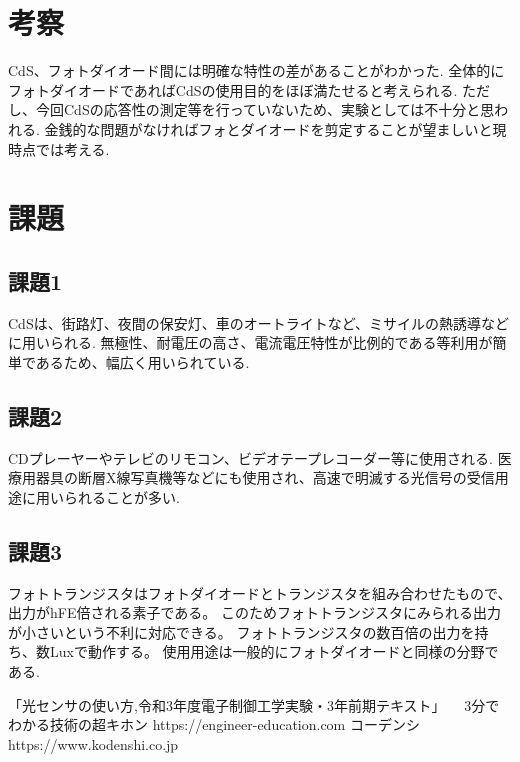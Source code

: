 \documentclass[titlepage]{jarticle}
\begin{document}
\section{考察}
CdS、フォトダイオード間には明確な特性の差があることがわかった.
全体的にフォトダイオードであればCdSの使用目的をほぼ満たせると考えられる.
ただし、今回CdSの応答性の測定等を行っていないため、実験としては不十分と思われる.
金銭的な問題がなければフォとダイオードを剪定することが望ましいと現時点では考える.

\section{課題}
\subsection{課題1}
CdSは、街路灯、夜間の保安灯、車のオートライトなど、ミサイルの熱誘導などに用いられる.
無極性、耐電圧の高さ、電流電圧特性が比例的である等利用が簡単であるため、幅広く用いられている.
\subsection{課題2}
CDプレーヤーやテレビのリモコン、ビデオテープレコーダー等に使用される.
医療用器具の断層X線写真機等などにも使用され、高速で明滅する光信号の受信用途に用いられることが多い.
\subsection{課題3}
フォトトランジスタはフォトダイオードとトランジスタを組み合わせたもので、出力がhFE倍される素子である。
このためフォトトランジスタにみられる出力が小さいという不利に対応できる。
フォトトランジスタの数百倍の出力を持ち、数Luxで動作する。
使用用途は一般的にフォトダイオードと同様の分野である.

\begin{thebibliography}{99}
    \bibitem{}「光センサの使い方,令和3年度電子制御工学実験・3年前期テキスト」
    \bibitem{}　3分でわかる技術の超キホン https://engineer-education.com
    \bibitem{} コーデンシ https://www.kodenshi.co.jp
\end{thebibliography}
\end{document}
